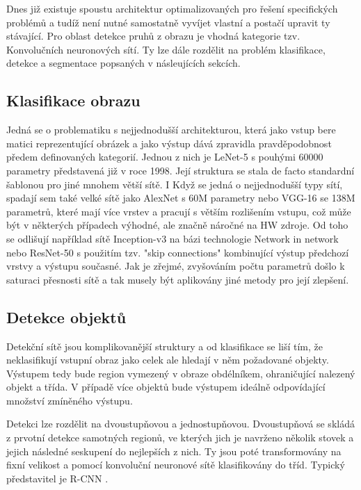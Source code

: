 \documentclass[czech, bc, kky, he, iso690alph]{fasthesis}
\begin{document}
           	Dnes již existuje spoustu architektur optimalizovaných pro řešení specifických problémů a tudíž není nutné samostatně vyvíjet vlastní a postačí upravit ty stávající. Pro oblast detekce pruhů z obrazu je vhodná kategorie tzv. Konvolučních neuronových sítí. Ty lze dále rozdělit na problém klasifikace, detekce a segmentace popsaných v násleujících sekcích.
           	
           	\subsection{Klasifikace obrazu} \label{subsec:klasifikace_obrazu}
           		Jedná se o problematiku s nejjednodušší architekturou, která jako vstup bere matici reprezentující obrázek a jako výstup dává zpravidla pravděpodobnost předem definovaných kategorií. Jednou z nich je LeNet-5 \cite{LeNet-5} s pouhými 60000 parametry představená již v roce 1998. Její struktura se stala de facto standardní šablonou pro jiné mnohem větší sítě. I Když se jedná o nejjednodušší typy sítí, spadají sem také velké sítě jako AlexNet \cite{ImageNet} s 60M parametry nebo VGG-16 \cite{VGG-16} se 138M parametrů, které mají více vrstev a pracují s větším rozlišením vstupu, což může být v některých případech výhodné, ale značně náročné na HW zdroje. Od toho se odlišují například sítě Inception-v3 \cite{Inception-v3} na bázi technologie Network in network \cite{Network_in_network} nebo ResNet-50 \cite{ResNet-50} s použitím tzv. "skip connections"  kombinující výstup předchozí vrstvy a výstupu současné. Jak je zřejmé, zvyšováním počtu parametrů došlo k saturaci přesnosti sítě a tak musely být aplikovány jiné metody pro její zlepšení.
           	
           	\subsection{Detekce objektů}\label{subsec:detekce_objektu}
           		Detekční sítě jsou komplikovanější struktury a od klasifikace se liší tím, že neklasifikují vstupní obraz jako celek ale hledají v něm požadované objekty. Výstupem tedy bude region vymezený v obraze obdélníkem, ohraničující nalezený objekt a třída. V případě více objektů bude výstupem ideálně odpovídající množství zmíněného výstupu.
           		
           		Detekci lze rozdělit na dvoustupňovou a jednostupňovou. Dvoustupňová se skládá z prvotní detekce samotných regionů, ve kterých jich je navrženo několik stovek a jejich následné seskupení do nejlepších z nich. Ty jsou poté transformovány na fixní velikost a pomocí konvoluční neuronové sítě klasifikovány do tříd. Typický představitel je R-CNN \cite{R-CNN}.
           		
\end{document}
